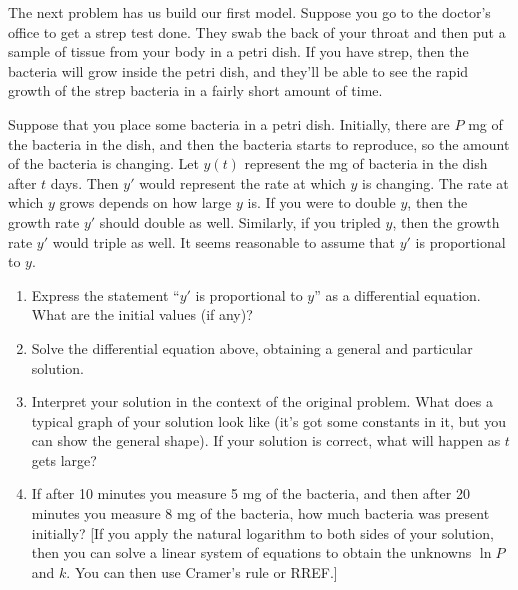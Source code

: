 The next problem has us build our first model.
Suppose you go to the doctor's office to get a strep test done.  They swab the back of your throat and then put a sample of tissue from your body in a petri dish.  If you have strep, then the bacteria will grow inside the petri dish, and they'll be able to see the rapid growth of the strep bacteria in a fairly short amount of time. 
\begin{problem}\label{exponential growth application}
Suppose that you place some bacteria in a petri dish. Initially, there are $P$ mg of the bacteria in the dish, and then the bacteria starts to reproduce, so the amount of the bacteria is changing. Let $y(t)$ represent the mg of bacteria in the dish after $t$ days. Then $y'$ would represent the rate at which $y$ is changing. The rate at which $y$ grows depends on how large $y$ is.  If you were to double $y$, then the growth rate $y'$ should double as well. Similarly, if you tripled $y$, then the growth rate $y'$ would triple as well. It seems reasonable to assume that $y'$ is proportional to $y$.
\begin{enumerate}
 \item Express the statement ``$y'$ is proportional to $y$'' as a differential equation. What are the initial values (if any)?
 \item Solve the differential equation above, obtaining a general and particular solution.
 \item Interpret your solution in the context of the original problem. What does a typical graph of your solution look like (it's got some constants in it, but you can show the general shape). If your solution is correct, what will happen as $t$ gets large?
 \item If after 10 minutes you measure 5 mg of the bacteria, and then after 20 minutes you measure 8 mg of the bacteria, how much bacteria was present initially? [If you apply the natural logarithm to both sides of your solution, then you can solve a linear system of equations to obtain the unknowns $\ln P$ and $k$. You can then use Cramer's rule or RREF.]
\end{enumerate}
\end{problem}

